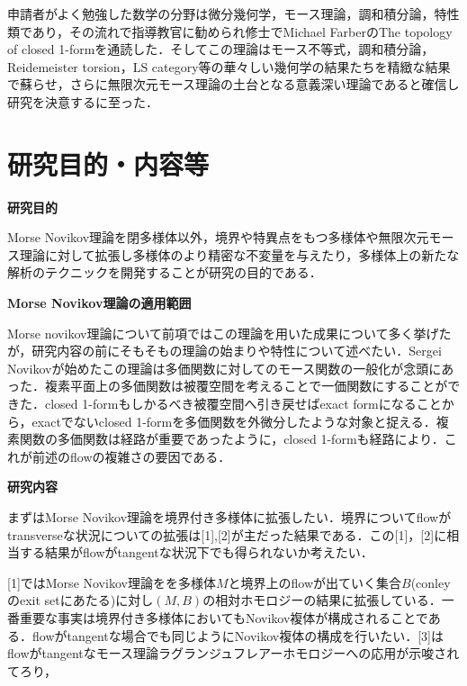 \documentclass[11pt,a4j,dvipdfmx]{jarticle} 					%
\newcommand{\研究課題名}{象の卵}
\newcommand{\研究機関名}{京都大学}
\newcommand{\研究代表者氏名}{福士謙二}
\begin{document}
	申請者がよく勉強した数学の分野は微分幾何学，モース理論，調和積分論，特性類であり，その流れで指導教官に勧められ修士でMichael FarberのThe topology of closed 1-formを通読した．そしてこの理論はモース不等式，調和積分論，Reidemeister torsion，LS category等の華々しい幾何学の結果たちを精緻な結果で蘇らせ，さらに無限次元モース理論の土台となる意義深い理論であると確信し研究を決意するに至った．





\section{研究目的・内容等}

\noindent
\textbf{研究目的}

Morse Novikov理論を閉多様体以外，境界や特異点をもつ多様体や無限次元モース理論に対して拡張し多様体のより精密な不変量を与えたり，多様体上の新たな解析のテクニックを開発することが研究の目的である．


\noindent
\textbf{Morse Novikov理論の適用範囲}

Morse novikov理論について前項ではこの理論を用いた成果について多く挙げたが，研究内容の前にそもそもの理論の始まりや特性について述べたい．Sergei Novikovが始めたこの理論は多価関数に対してのモース関数の一般化が念頭にあった．複素平面上の多価関数は被覆空間を考えることで一価関数にすることができた．closed 1-formもしかるべき被覆空間へ引き戻せばexact formになることから，exactでないclosed 1-formを多価関数を外微分したような対象と捉える．複素関数の多価関数は経路が重要であったように，closed 1-formも経路により．これが前述のflowの複雑さの要因である．

\noindent
\textbf{研究内容}

まずはMorse Novikov理論を境界付き多様体に拡張したい．境界についてflowがtransverseな状況についての拡張は[1],[2]が主だった結果である．この[1]，[2]に相当する結果がflowがtangentな状況下でも得られないか考えたい．


[1]ではMorse Novikov理論をを多様体$M$と境界上のflowが出ていく集合$B$(conleyのexit setにあたる)に対し$(M,B)$の相対ホモロジーの結果に拡張している．一番重要な事実は境界付き多様体においてもNovikov複体が構成されることである．flowがtangentな場合でも同じようにNovikov複体の構成を行いたい．[3]はflowがtangentなモース理論ラグランジュフレアーホモロジーへの応用が示唆されてろり，
\end{document}
